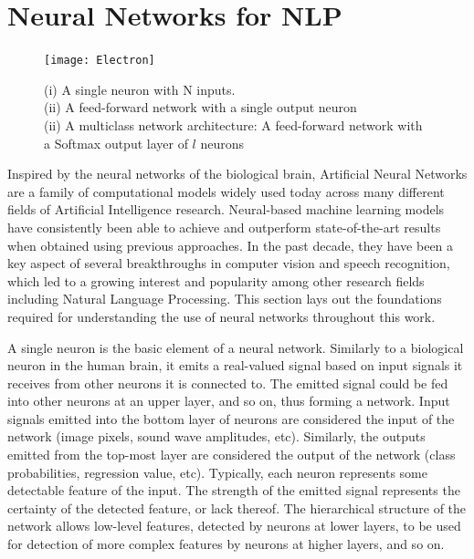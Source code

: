 \pagebreak

\section{Neural Networks for NLP}

\begin{figure}
  \centering
    \texttt{[image: Electron]}
  \caption{ 
    (i) A single neuron with N inputs. \\
    (ii) A feed-forward network with a single output neuron \\
    (ii) A multiclass network architecture: A feed-forward network with a Softmax output layer of $l$ neurons \\    
  }
  \label{fig:networks}
\end{figure}

Inspired by the neural networks of the biological brain, Artificial Neural Networks are a family of computational models widely used today across many different fields of Artificial Intelligence research. Neural-based machine learning models have consistently been able to achieve and outperform state-of-the-art results when obtained using previous approaches. In the past decade, they have been a key aspect of several breakthroughs in computer vision and speech recognition, which led to a growing interest and popularity among other research fields including Natural Language Processing. This section lays out the foundations required for understanding the use of neural networks throughout this work.

\medskip

A single neuron is the basic element of a neural network. Similarly to a biological neuron in the human brain, it emits a real-valued signal based on input signals it receives from other neurons it is connected to. The emitted signal could be fed into other neurons at an upper layer, and so on, thus forming a network. Input signals emitted into the bottom layer of neurons are considered the input of the network (image pixels, sound wave amplitudes, etc). Similarly, the outputs emitted from the top-most layer are considered the output of the network (class probabilities, regression value, etc). Typically, each neuron represents some detectable feature of the input. The strength of the emitted signal represents the certainty of the detected feature, or lack thereof. The hierarchical structure of the network allows low-level features, detected by neurons at lower layers, to be used for detection of more complex features by neurons at higher layers, and so on.

